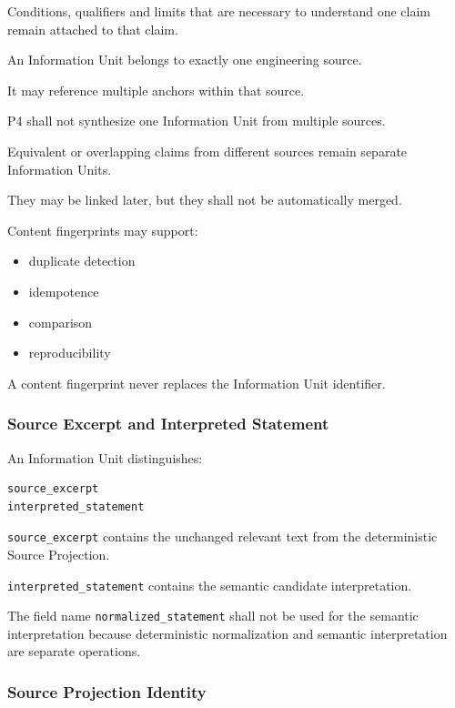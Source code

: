 Conditions, qualifiers and limits that are necessary to understand one claim remain attached to that claim.

An Information Unit belongs to exactly one engineering source.

It may reference multiple anchors within that source.

P4 shall not synthesize one Information Unit from multiple sources.

Equivalent or overlapping claims from different sources remain separate Information Units.

They may be linked later, but they shall not be automatically merged.

Content fingerprints may support:

\begin{itemize}
\tightlist
\item
  duplicate detection
\item
  idempotence
\item
  comparison
\item
  reproducibility
\end{itemize}

A content fingerprint never replaces the Information Unit identifier.

\hypertarget{source-excerpt-and-interpreted-statement}{%
\subsubsection{Source Excerpt and Interpreted Statement}\label{source-excerpt-and-interpreted-statement}}

An Information Unit distinguishes:

\begin{verbatim}
source_excerpt
interpreted_statement
\end{verbatim}

\texttt{source\_excerpt} contains the unchanged relevant text from the deterministic Source Projection.

\texttt{interpreted\_statement} contains the semantic candidate interpretation.

The field name \texttt{normalized\_statement} shall not be used for the semantic interpretation because deterministic normalization and semantic interpretation are separate operations.

\hypertarget{source-projection-identity}{%
\subsubsection{Source Projection Identity}\label{source-projection-identity}}

